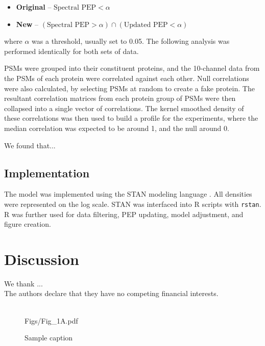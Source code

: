 \begin{spacing}{1.55}
\begin{itemize}
\item \textbf{Original} -- $\mbox{Spectral PEP} < \alpha$
\item \textbf{New} -- $(\mbox{Spectral PEP} > \alpha) \cap (\mbox{Updated PEP} < \alpha)$
\end{itemize}
where $\alpha$ was a threshold, usually set to 0.05. The following analysis was performed identically for both sets of data.

PSMs were grouped into their constituent proteins, and the 10-channel data from the PSMs of each protein were correlated against each other. Null correlations were also calculated, by selecting PSMs at random to create a fake protein. The resultant correlation matrices from each protein group of PSMs were then collapsed into a single vector of correlations. The kernel smoothed density of these correlations was then used to build a profile for the experiments, where the median correlation was expected to be around 1, and the null around 0.

We found that...


\subsection{Implementation}

The model was implemented using the STAN modeling language \citep{carpenter2017stan}.  All densities were represented on the log scale. STAN was interfaced into R scripts with \texttt{rstan}. R was further used for data filtering, PEP updating, model adjustment, and figure creation.

\section{Discussion}

\bigskip
\bigskip
\bigskip

 We thank ...\\
 
 The authors declare that they have no
competing financial interests.\\
 
 \\


\begin{figure}[h!]
	\begin{overpic}
		[width = .98\textwidth]{Figs/Fig_1A.pdf} 
	\end{overpic}
	\caption{Sample caption}
	\label{plot:test}
\end{figure}

\printbibliography

\end{spacing}

